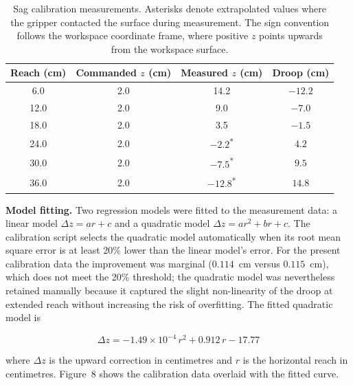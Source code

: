 \begin{table}[H]
    \centering
    \renewcommand{\arraystretch}{1.3}
    \begin{tabular}{|c|c|c|c|}
        \hline
        \textbf{Reach (cm)} & 
        \textbf{Commanded $z$ (cm)} & 
        \textbf{Measured $z$ (cm)} & 
        \textbf{Droop (cm)} \\
        \hline
        6.0  & 2.0 & 14.2 & $-12.2$ \\
        \hline
        12.0 & 2.0 & 9.0  & $-7.0$  \\
        \hline
        18.0 & 2.0 & 3.5  & $-1.5$  \\
        \hline
        24.0 & 2.0 & $-2.2$\textsuperscript{*} & $4.2$ \\
        \hline
        30.0 & 2.0 & $-7.5$\textsuperscript{*} & $9.5$ \\
        \hline
        36.0 & 2.0 & $-12.8$\textsuperscript{*} & $14.8$ \\
        \hline
    \end{tabular}
    \caption{Sag calibration measurements. Asterisks denote 
    extrapolated values where the gripper contacted the surface 
    during measurement. The sign convention follows the workspace 
    coordinate frame, where positive $z$ points upwards from the 
    workspace surface.}
\end{table}

\textbf{Model fitting.} Two regression models were fitted to the
measurement data: a linear model
$\Delta z = a r + c$ and a quadratic model
$\Delta z = a r^2 + b r + c$. The calibration script selects
the quadratic model automatically when its root mean square
error is at least 20\% lower than the linear model's error.
For the present calibration data the improvement was marginal
($0.114$~cm versus $0.115$~cm), which does not meet the 20\%
threshold; the quadratic model was nevertheless retained
manually because it captured the slight non-linearity of the
droop at extended reach without increasing the risk of
overfitting. The fitted quadratic model is

\begin{equation}
    \Delta z = -1.49 \times 10^{-4} \, r^2 + 0.912 \, r - 17.77
\end{equation}

where $\Delta z$ is the upward correction in centimetres and 
$r$ is the horizontal reach in centimetres. Figure~8 shows the 
calibration data overlaid with the fitted curve.

